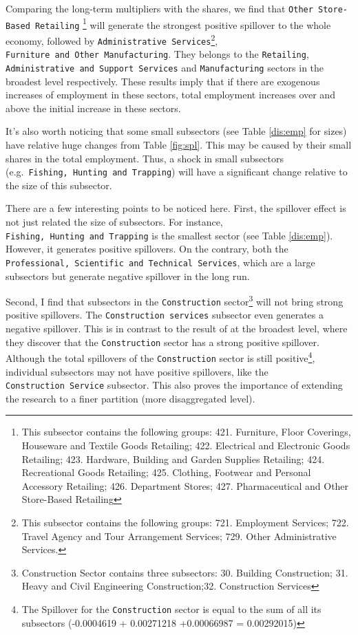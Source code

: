 \documentclass{monashthesis}
\begin{document}
Comparing the long-term multipliers with the shares, we find that \texttt{Other\ Store-Based\ Retailing} \footnote{This subsector contains the following groups: 421. Furniture, Floor Coverings, Houseware and Textile Goods Retailing; 422. Electrical and Electronic Goods Retailing; 423. Hardware, Building and Garden Supplies Retailing; 424. Recreational Goods Retailing; 425. Clothing, Footwear and Personal Accessory Retailing; 426. Department Stores; 427. Pharmaceutical and Other Store-Based Retailing} will generate the strongest positive spillover to the whole economy, followed by \texttt{Administrative\ Services}\footnote{This subsector contains the following groups: 721. Employment Services; 722. Travel Agency and Tour Arrangement Services; 729. Other Administrative Services.}, \texttt{Furniture\ and\ Other\ Manufacturing}. They belongs to the \texttt{Retailing}, \texttt{Administrative\ and\ Support\ Services} and \texttt{Manufacturing} sectors in the broadest level respectively. These results imply that if there are exogenous increases of employment in these sectors, total employment increases over and above the initial increase in these sectors.

It's also worth noticing that some small subsectors (see Table \ref{dis:emp} for sizes) have relative huge changes from Table \ref{fig:spl}. This may be caused by their small shares in the total employment. Thus, a shock in small subsectors (e.g.~\texttt{Fishing,\ Hunting\ and\ Trapping}) will have a significant change relative to the size of this subsector.

There are a few interesting points to be noticed here. First, the spillover effect is not just related the size of subsectors. For instance, \texttt{Fishing,\ Hunting\ and\ Trapping} is the smallest sector (see Table \ref{dis:emp}). However, it generates positive spillovers. On the contrary, both the \texttt{Professional,\ Scientific\ and\ Technical\ Services}, which are a large subsectors but generate negative spillover in the long run.

Second, I find that subsectors in the \texttt{Construction} sector\footnote{Construction Sector contains three subsectors: 30. Building Construction; 31. Heavy and Civil Engineering Construction;32. Construction Services} will not bring strong positive spillovers. The \texttt{Construction\ services} subsector even generates a negative spillover. This is in contrast to the result of \textcite{anderson2020} at the broadest level, where they discover that the \texttt{Construction} sector has a strong positive spillover. Although the total spillovers of the \texttt{Construction} sector is still positive\footnote{The Spillover for the \texttt{Construction} sector is equal to the sum of all its subsectors (-0.0004619 + 0.00271218 +0.00066987 = 0.00292015)}, individual subsectors may not have positive spillovers, like the \texttt{Construction\ Service} subsector. This also proves the importance of extending the research to a finer partition (more disaggregated level).
\end{document}
